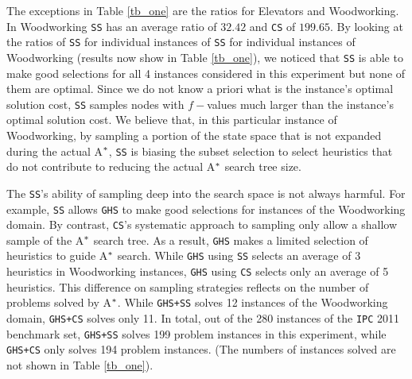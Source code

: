 The exceptions in Table \ref{tb_one} are the ratios for Elevators and Woodworking. In Woodworking \texttt{SS} has an average ratio of $32.42$ and \texttt{CS} of $199.65$. By looking at the ratios of \texttt{SS} for individual instances of \texttt{SS} for individual instances of Woodworking (results now show in Table \ref{tb_one}), we noticed that \texttt{SS} is able to make good selections for all 4 instances considered in this experiment but none of them are optimal. Since we do not know a priori what is the instance's optimal solution cost, \texttt{SS} samples nodes with $f-$values much larger than the instance's optimal solution cost. We believe that, in this particular instance of Woodworking, by sampling a portion of the state space that is not expanded during the actual A$\sp{*}$, \texttt{SS} is biasing the subset selection to select heuristics that do not contribute to reducing the actual A$\sp{*}$ search tree size.

The \texttt{SS}'s ability of sampling deep into the search space is not always harmful. For example, \texttt{SS} allows \texttt{GHS} to make good selections for instances of the Woodworking domain. By contrast, \texttt{CS}'s systematic approach to sampling only allow a shallow sample of the A$\sp{*}$ search tree. As a result, \texttt{GHS} makes a limited selection of heuristics to guide A$\sp{*}$ search. While \texttt{GHS} using \texttt{SS} selects an average of 3 heuristics in Woodworking instances, \texttt{GHS} using \texttt{CS} selects only an average of 5 heuristics. This difference on sampling strategies reflects on the number of problems solved by A$\sp{*}$. While \texttt{GHS+SS} solves 12 instances of the Woodworking domain, \texttt{GHS+CS} solves only 11. In total, out of the 280 instances of the \texttt{IPC} 2011 benchmark set, \texttt{GHS+SS} solves 199 problem instances in this experiment, while \texttt{GHS+CS} only solves 194 problem instances. (The numbers of instances solved are not shown in Table \ref{tb_one}).

